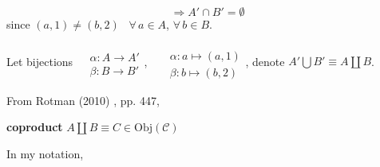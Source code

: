 \[
\Longrightarrow A' \cap B' = \emptyset 
\]
since $(a,1) \neq (b,2)$ \, $\forall \, a \in A$, $\forall \, b \in B$.

Let bijections $\begin{aligned} & \quad \\
& \alpha : A \to A' \\
& \beta : B \to B' \end{aligned}$, \qquad \, $\begin{aligned} & \quad \\
& \alpha : a \mapsto (a,1) \\
& \beta : b\mapsto (b,2) \end{aligned}$, denote $A'\bigcup B' \equiv A \coprod B$.

From Rotman (2010) \cite{agat:JRotman2010}, pp. 447,
\begin{definition}
	\textbf{coproduct} $A \coprod B \equiv C \in \text{Obj}(\mathcal{C})$
\end{definition}

In my notation,

